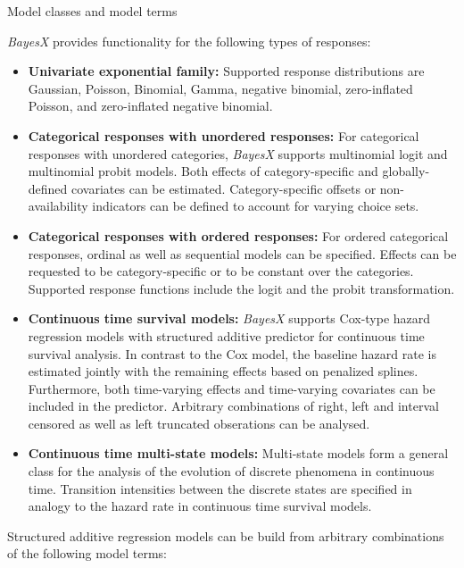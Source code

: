 \begin{stanza}{Model classes and model terms}

{\em BayesX} provides functionality for the following types of
responses:

\begin{itemize}
\item{\bf\sffamily Univariate exponential family:} Supported response distributions are Gaussian, Poisson, Binomial, Gamma,
    negative binomial, zero-inflated Poisson, and zero-inflated negative binomial.

\item{\bf\sffamily Categorical responses with unordered responses:} For categorical responses with unordered categories,
    {\em BayesX} supports multinomial logit and multinomial probit models. Both effects of category-specific and
    globally-defined covariates can be estimated. Category-specific offsets or non-availability indicators can be defined
    to account for varying choice sets.

\item{\bf\sffamily Categorical responses with ordered responses:} For ordered categorical responses, ordinal as well as
    sequential models can be specified. Effects can be requested to be category-specific or to be constant over the
    categories. Supported response functions include the logit and the probit transformation.

\item{\bf\sffamily Continuous time survival models:} {\em BayesX} supports Cox-type hazard regression models with
    structured additive predictor for continuous time survival analysis. In contrast to the Cox model, the baseline hazard
    rate is estimated jointly with the remaining effects based on penalized splines. Furthermore, both time-varying effects
    and time-varying covariates can be included in the predictor. Arbitrary combinations of right, left and interval
    censored as well as left truncated obserations can be analysed.

\item{\bf\sffamily Continuous time multi-state models:} Multi-state models form a general class for the analysis of the
    evolution of discrete phenomena in continuous time. Transition intensities between the discrete states are specified in
    analogy to the hazard rate in continuous time survival models.
\end{itemize}

Structured additive regression models can be build from arbitrary
combinations of the following model terms:


\end{stanza}
